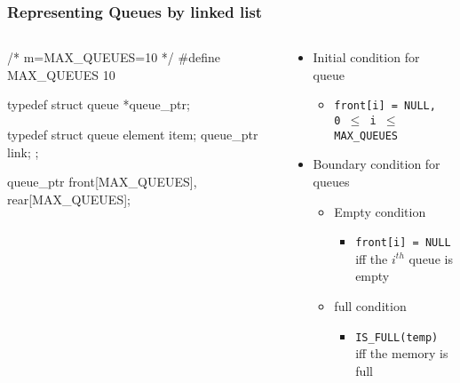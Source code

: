 \documentclass[newPxFont,sthlmFooter,nooffset]{beamer}
\begin{document}
\begin{frame}[t, fragile]
  \frametitle{Representing Queues by linked list}
  \begin{columns}
    \begin{column}{0.5\textwidth}
  \begin{ncodedef}
/* m=MAX_QUEUES=10 */ 
#define MAX_QUEUES 10 

typedef struct queue *queue_ptr;

typedef struct queue {
    element item;
    queue_ptr link; 
};

queue_ptr front[MAX_QUEUES], 
          rear[MAX_QUEUES];    
  \end{ncodedef}      
    \end{column}
    \begin{column}{0.5\textwidth}
      \begin{itemize}
      \item Initial condition for queue
        \begin{itemize}
        \item \texttt{front[i] = NULL, \\0 $\leq$ i $\leq$ MAX\_QUEUES}
        \end{itemize}
      \item Boundary condition for queues
        \begin{itemize}
        \item Empty condition
          \begin{itemize}
          \item \texttt{front[i] = NULL} \\iff the $i^{th}$ queue is empty
          \end{itemize}

        \item full condition
          \begin{itemize}
          \item \texttt{IS\_FULL(temp)} \\iff the memory is full
          \end{itemize}

        \end{itemize}


      \end{itemize}
    \end{column}
  \end{columns}

\end{frame}
\end{document}
